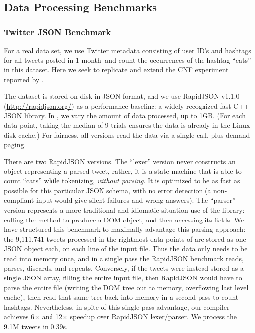 \subsection{Data Processing Benchmarks}



\subsubsection{Twitter JSON Benchmark}

For a real data set, we
use Twitter metadata consisting of user ID's and hashtags for all tweets posted
in 1 month, and count the occurrences of the hashtag ``cats'' in this dataset.
Here we seek to replicate and extend the CNF experiment reported by
\cite{cnf-icfp15}.

The dataset is stored on disk in JSON format, and we use RapidJSON
v1.1.0 ({\footnotesize\url{http://rapidjson.org/}}) as a performance baseline: a widely
recognized fast C++ JSON library.
%
In , we vary the amount of data processed,
up to 1GB.  (For each data-point, taking the median of 9 trials
ensures the data is already in the Linux disk cache.)
%
For fairness, all versions read the data via a single  call, plus
demand paging.

There are two RapidJSON versions. The ``lexer'' version never constructs an
object representing a parsed tweet, rather, it is a state-machine
that is able to count ``cats'' while tokenizing, {\em without parsing}.  It is
optimized to be as fast as possible for this particular JSON schema, with no
error detection (a non-compliant input would give silent failures and wrong
answers).
%
The ``parser'' version represents a more traditional and idiomatic situation use
of the library: calling the  method to produce a DOM object, and
then accessing its fields.
%
We have structured this benchmark to maximally advantage this parsing approach:
the 9,111,741 tweets processed in the rightmost data points of  are stored as one JSON object each, on each line of the input file.
%
Thus the data only needs to be read into memory once, and in a single pass the RapidJSON benchmark reads, parses, discards, and repeats.
%
Conversely, if the tweets were instead stored as a single JSON array, filling
the entire input file, then RapidJSON would have to parse the entire file
(writing the DOM tree out to memory, overflowing last level cache), then read
that same tree back into memory in a second pass to count hashtags.
%
Nevertheless, in spite of this single-pass advantage, our compiler achieves
6$\times$ and 12$\times$ speedup over RapidJSON lexer/parser.
%
We process the 9.1M tweets in 0.39s.


